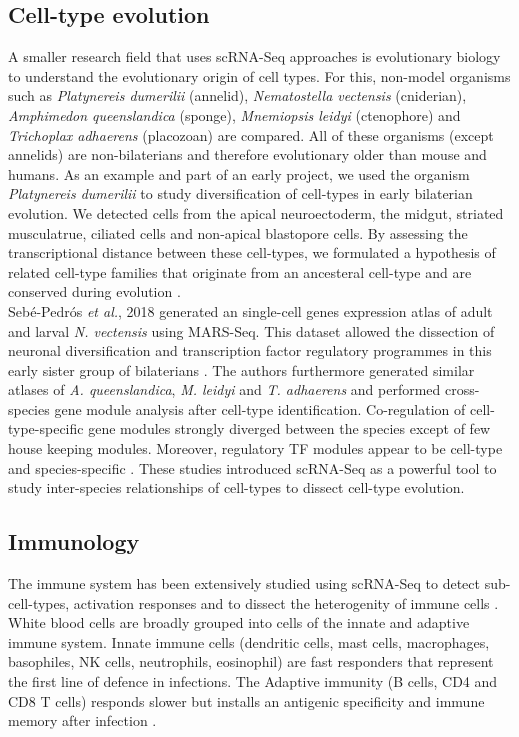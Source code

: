\subsection{Cell-type evolution} 

A smaller research field that uses scRNA-Seq approaches is evolutionary biology to understand the evolutionary origin of cell types. For this, non-model organisms such as \textit{Platynereis dumerilii} (annelid), \textit{Nematostella vectensis} (cniderian), \textit{Amphimedon queenslandica} (sponge), \textit{Mnemiopsis leidyi} (ctenophore) and \textit{Trichoplax adhaerens} (placozoan) are compared. All of these organisms (except annelids) are non-bilaterians and therefore evolutionary older than mouse and humans. As an example and part of an early project, we used the organism \textit{Platynereis dumerilii} to study diversification of cell-types in early bilaterian evolution. We detected cells from the apical neuroectoderm, the midgut, striated musculatrue, ciliated cells and non-apical blastopore cells. By assessing the transcriptional distance between these cell-types, we formulated a hypothesis of related cell-type families that originate from an ancesteral cell-type and are conserved during evolution \citep{Achim2018}.  \\

Seb\'e{}-Pedr\'o{}s \emph{et al.}, 2018 generated an single-cell genes expression atlas of adult and larval \textit{N. vectensis} using MARS-Seq. This dataset allowed the dissection of neuronal diversification and transcription factor regulatory programmes in this early sister group of bilaterians \citep{Sebe-Pedros2018}. The authors furthermore generated similar atlases of \textit{A. queenslandica}, \textit{M. leidyi} and \textit{T. adhaerens} and performed cross-species gene module analysis after cell-type identification. Co-regulation of cell-type-specific gene modules strongly diverged between the species except of few house keeping modules. Moreover, regulatory TF modules appear to be cell-type and species-specific \citep{Sebe-Pedros2018a}. These studies introduced scRNA-Seq as a powerful tool to study inter-species relationships of cell-types to dissect cell-type evolution. 

\subsection{Immunology}

The immune system has been extensively studied using scRNA-Seq to detect sub-cell-types, activation responses and to dissect the heterogenity of immune cells \citep{Proserpio2015, Satija2014}. White blood cells are broadly grouped into cells of the innate and adaptive immune system. Innate immune cells (dendritic cells, mast cells, macrophages, basophiles, \gls{NK} cells, neutrophils, eosinophil) are fast responders that represent the first line of defence in infections. The Adaptive immunity (B cells, CD4\plus{} and CD8\plus{} T cells) responds slower but installs an antigenic specificity and immune memory after infection \citep{Dranoff2004}. \\

